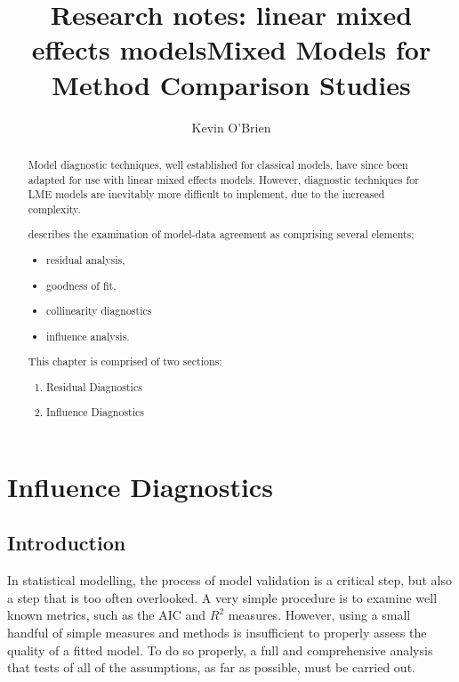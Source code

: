 \documentclass[12pt, a4paper]{report}
\title{Research notes: linear mixed effects models}
\author{ } \date{ }
\theoremstyle{plain}
\theoremstyle{definition}
\theoremstyle{remark}
\begin{document}
\author{Kevin O'Brien}
\title{Mixed Models for Method Comparison Studies}
\tableofcontents
\begin{abstract}
	Model diagnostic techniques, well established for classical models, have since been adapted for use with linear mixed effects models. However, diagnostic techniques for LME models are inevitably more difficult to implement, due to the increased complexity. \\ \bigskip
	
	
	\citet{schabenberger} describes the examination of model-data agreement as comprising several elements; \begin{itemize}
		\item residual analysis, 
		\item goodness of fit, 
		\item collinearity diagnostics
		\item influence analysis.
	\end{itemize} 
	
	This chapter is comprised of two sections:
	\begin{enumerate}
		\item Residual Diagnostics
		\item Influence Diagnostics
	\end{enumerate}
\end{abstract}
\chapter{Influence Diagnostics}




\section{Introduction}
In statistical modelling, the process of model validation is a critical step, but also a step that is too often overlooked. A very simple procedure is to examine well known
metrics, such as the AIC and $R^2$ measures. However, using a small handful of simple measures and methods is insufficient to properly assess the quality of a fitted model. To do so properly, a full and comprehensive
analysis that tests of all of the assumptions, as far as possible, must be carried out. 
\end{document}
